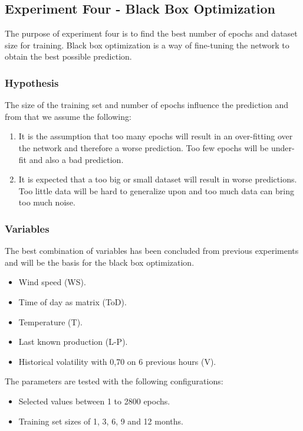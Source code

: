\subsection{Experiment Four - Black Box Optimization}
\label{sec:experimentFourBlackBox}
The purpose of experiment four is to find the best number of epochs and dataset size for training. Black box optimization is a way of fine-tuning the network to obtain the best possible prediction.

\subsubsection{Hypothesis}
The size of the training set and number of epochs influence the prediction and from that we assume the following:
\begin{enumerate}
\item It is the assumption that too many epochs will result in an over-fitting over the network and therefore a worse prediction. Too few epochs will be under-fit and also a bad prediction.
\item It is expected that a too big or small dataset will result in worse predictions. Too little data will be hard to generalize upon and too much data can bring too much noise.
\end{enumerate}

\subsubsection{Variables}
The best combination of variables has been concluded from previous experiments and will be the basis for the black box optimization. 

\begin{itemize}
\item Wind speed (WS).
\item Time of day as matrix (ToD).
\item Temperature (T).
\item Last known production (L-P).
\item Historical volatility with 0,70 on 6 previous hours (V).
\end{itemize}

The parameters are tested with the following configurations:

\begin{itemize}
\item Selected values between 1 to 2800 epochs.
\item Training set sizes of 1, 3, 6, 9 and 12 months.
\end{itemize}

